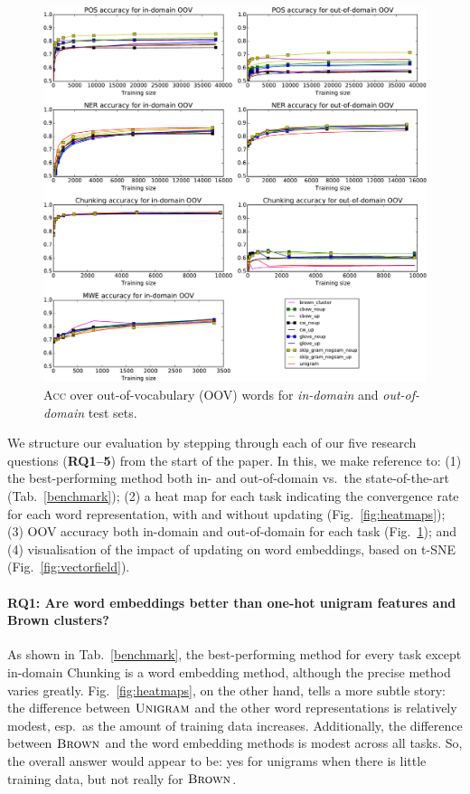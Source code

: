 \documentclass[11pt]{article}
\newcommand{\RQ}[1][1]{\textbf{RQ#1}\xspace}
\newcommand{\figref}[2][]{Fig#1.~\ref{#2}\xspace}
\newcommand{\tabref}[2][]{Tab#1.~\ref{#2}\xspace}
\newcommand{\method}[2][]{\ensuremath{\textsc{#2#1}}\xspace}
\newcommand{\unigram}[1][]{\method{Unigram}}
\newcommand{\brown}[1][]{\method[\ensuremath{_{#1}}]{Brown}}
\newcommand{\task}[1]{\textsf{#1}\xspace}
\newcommand{\chunking}{\task{Chunking}}
\newcommand{\evmeasure}[1]{\textsc{#1}\xspace}
\newcommand{\accuracy}{\evmeasure{Acc}}
\begin{document}
\begin{figure}[t!]
\centering
    	\includegraphics[scale=0.5]{oovplots}
\caption{\accuracy over out-of-vocabulary (OOV) words for \textit{in-domain} and \textit{out-of-domain} test sets.}
\label{OOV} 
\end{figure}



We structure our evaluation by stepping through each of our five
research questions (\RQ[1--5]) from the start of the paper. In this, we
make reference to: (1) the best-performing method both in- and
out-of-domain vs.\ the state-of-the-art (\tabref{benchmark}); (2) a
heat map for each task indicating the convergence rate for each word
representation, with and without updating (\figref{fig:heatmaps}); 
(3) OOV accuracy both in-domain and out-of-domain for each task
(\figref{OOV}); and (4)  visualisation of the impact of
updating on word embeddings, based on t-SNE
(\figref{fig:vectorfield}).

\paragraph{\RQ[1]: Are word embeddings better than one-hot unigram features
  and Brown clusters?}  As shown in \tabref{benchmark}, the
best-performing method for every task except in-domain \chunking is a
word embedding method, although the precise method varies
greatly. \figref{fig:heatmaps}, on the other hand, tells a more subtle
story: the difference between \unigram and the other word
representations is relatively modest, esp.\ as the amount of training
data increases. Additionally, the difference between \brown and the word
embedding methods is modest across all tasks. So, the overall answer
would appear to be: yes for unigrams when there is little training data, but not really for \brown.
\end{document}
